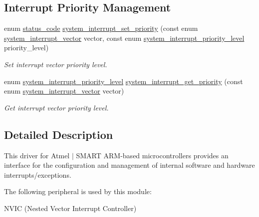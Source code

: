 \subsection*{Interrupt Priority Management}
\begin{DoxyCompactItemize}
\item 
enum \hyperlink{group__group__sam0__utils__status__codes_ga751c892e5a46b8e7d282085a5a5bf151}{status\+\_\+code} \hyperlink{group__asfdoc__sam0__system__interrupt__group_ga0be1259c9dc64c3dd8f0d45e3f04ee76}{system\+\_\+interrupt\+\_\+set\+\_\+priority} (const enum \hyperlink{group__asfdoc__sam0__system__interrupt__group_ga43378e6222cc05290c1a0c6a9ba125cf}{system\+\_\+interrupt\+\_\+vector} vector, const enum \hyperlink{group__asfdoc__sam0__system__interrupt__group_ga6d21907577ff204de7f5fa4642c84589}{system\+\_\+interrupt\+\_\+priority\+\_\+level} priority\+\_\+level)
\begin{DoxyCompactList}\small\item\em Set interrupt vector priority level. \end{DoxyCompactList}\item 
enum \hyperlink{group__asfdoc__sam0__system__interrupt__group_ga6d21907577ff204de7f5fa4642c84589}{system\+\_\+interrupt\+\_\+priority\+\_\+level} \hyperlink{group__asfdoc__sam0__system__interrupt__group_ga586466a55934c76a69332b6819f4904a}{system\+\_\+interrupt\+\_\+get\+\_\+priority} (const enum \hyperlink{group__asfdoc__sam0__system__interrupt__group_ga43378e6222cc05290c1a0c6a9ba125cf}{system\+\_\+interrupt\+\_\+vector} vector)
\begin{DoxyCompactList}\small\item\em Get interrupt vector priority level. \end{DoxyCompactList}\end{DoxyCompactItemize}


\subsection{Detailed Description}
This driver for Atmel\textregistered{} $\vert$ S\+M\+A\+R\+T A\+R\+M\textregistered{}-\/based microcontrollers provides an interface for the configuration and management of internal software and hardware interrupts/exceptions.

The following peripheral is used by this module\+:
\begin{DoxyItemize}
\item N\+V\+I\+C (Nested Vector Interrupt Controller)
\end{DoxyItemize}

